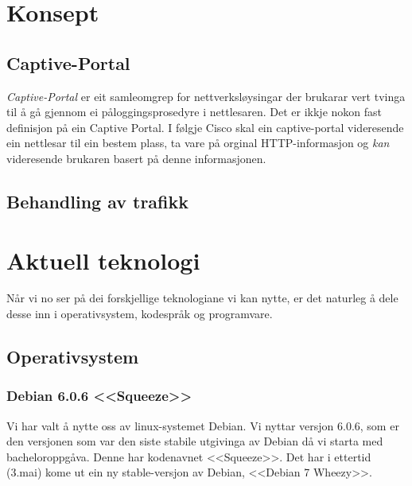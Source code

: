 \documentclass[nynorsk,12pt,a4paper,oneside]{book}
\begin{document}
\section{Konsept}
\subsection{Captive-Portal}
\emph{Captive-Portal} er eit samleomgrep for nettverksløysingar der brukarar vert tvinga til å gå gjennom ei påloggingsprosedyre i nettlesaren. Det er ikkje nokon fast definisjon på ein Captive Portal. I følgje Cisco skal ein captive-portal videresende ein nettlesar til ein bestem plass, ta vare på orginal HTTP-informasjon og \emph{kan} videresende brukaren basert på denne informasjonen. \cite{ciscoCP}


\subsection{Behandling av trafikk}

\section{Aktuell teknologi}
Når vi no ser på dei forskjellige teknologiane vi kan nytte, er det naturleg å dele desse inn i operativsystem, kodespråk og programvare. 
\subsection{Operativsystem}
\subsubsection{Debian 6.0.6 <<Squeeze>>} 
Vi har valt å nytte oss av linux-systemet Debian. Vi nyttar versjon 6.0.6, som er den versjonen som var den siste stabile utgivinga av Debian då vi starta med bacheloroppgåva. Denne har kodenavnet <<Squeeze>>. Det har i ettertid (3.mai) kome ut ein ny stable-versjon av Debian, <<Debian 7 Wheezy>>. \cite{wheezy}
\end{document}

